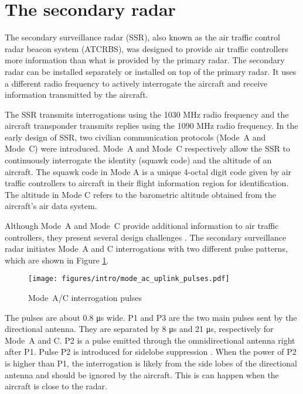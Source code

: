\section{The secondary radar}

The secondary surveillance radar (SSR), also known as the air traffic control radar beacon system (ATCRBS), was designed to provide air traffic controllers more information than what is provided by the primary radar. The secondary radar can be installed separately or installed on top of the primary radar. It uses a different radio frequency to actively interrogate the aircraft and receive information transmitted by the aircraft.

The SSR transmits interrogations using the 1030 MHz radio frequency and the aircraft transponder transmits replies using the 1090 MHz radio frequency. In the early design of SSR, two civilian communication protocols (Mode~A and Mode~C) were introduced. Mode~A and Mode~C respectively allow the SSR to continuously interrogate the identity (squawk code) and the altitude of an aircraft. The squawk code in Mode A is a unique 4-octal digit code given by air traffic controllers to aircraft in their flight information region for identification. The altitude in Mode C refers to the barometric altitude obtained from the aircraft's air data system. 

Although Mode~A and Mode~C provide additional information to air traffic controllers, they present several design challenges \cite{icao1983}. The secondary surveillance radar initiates Mode~A and C interrogations with two different pulse patterns, which are shown in Figure \ref{fig:mode_ac_uplink_pulses}.

\begin{figure}[ht]
  \texttt{[image: figures/intro/mode\_ac\_uplink\_pulses.pdf]}
  \caption{Mode~A/C interrogation pulses}
  \label{fig:mode_ac_uplink_pulses}
\end{figure}

The pulses are about 0.8 μs wide. P1 and P3 are the two main pulses sent by the directional antenna. They are separated by 8 μs and 21 μs, respectively for Mode~A and C. P2 is a pulse emitted through the omnidirectional antenna right after P1. Pulse P2 is introduced for sidelobe suppression \cite{orlando1989}. When the power of P2 is higher than P1, the interrogation is likely from the side lobes of the directional antenna and should be ignored by the aircraft. This is can happen when the aircraft is close to the radar.

